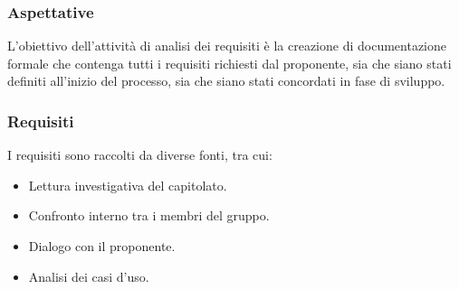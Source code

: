\documentclass{article}
\begin{document}
\subsubsection*{Aspettative}
L'obiettivo dell'attività di analisi dei requisiti è la creazione di documentazione formale che contenga tutti i requisiti richiesti dal proponente, sia che siano stati definiti all'inizio del processo, sia che siano stati concordati in fase di sviluppo.
\subsubsection*{Requisiti}
I requisiti sono raccolti da diverse fonti, tra cui:
\begin{itemize}
    \item Lettura investigativa del capitolato.
    \item Confronto interno tra i membri del gruppo.
    \item Dialogo con il proponente.
    \item Analisi dei casi d'uso.
\end{itemize}
\end{document}

